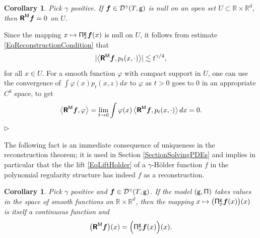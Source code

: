 \documentclass[10pt, reqno]{amsart}
\numberwithin{subsection}{section}
\numberwithin{subsubsection}{subsection}
\numberwithin{equation}{section} %
\newenvironment{Dem}[1][\unskip]{%
    \begin{list}{\hspace{1.15cm}{\sf \textbf{{\small Proof #1 --}}}}{%
        \setlength{\topsep}{0pt}%
        \setlength{\leftmargin}{0pt}%
        \setlength{\rightmargin}{0pt}%
        \setlength{\listparindent}{0pt}%
        \setlength{\itemindent}{0pt}%
        \setlength{\parsep}{0pt}%
        \addtolength{\leftmargin}{0pt}%
        \addtolength{\rightmargin}{0pt}%
    } \item }{\hfill $\rhd$\end{list}\smallskip}
\theoremstyle{mystyle}
\newtheorem{cor}[thm]{\hspace{-0.15cm}  {Corollary} }%
\theoremstyle{mystyle2}
\theoremstyle{mystyle3}
\newcommand{\bsf}{\boldsymbol{f}}
\newcommand\bbR{\mathbb{R}}
\newcommand{\mcD}{\mathcal{D}}
\begin{document}
\medskip

\begin{cor} \label{CorLocalDependenceReconstruction}
Pick $\gamma$ positive. If $\bsf\in\mcD^\gamma(T,{\sf g})$ is null on an open set $U\subset\bbR\times\bbR^d$, then $\textbf{\textsf{R}}^{\sf M}\bsf=0$ on $U$.
\end{cor}

\medskip

\begin{Dem}
Since the mapping $x\mapsto{\sf \Pi}^{\sf g}_x\bsf(x)$ is null on $U$, it follows from estimate \eqref{EqReconstructionCondition} that 
$$
\vert \big\langle \textbf{\textsf{R}}^{\sf M}\bsf, p_t(x,\cdot) \big\rangle \vert \lesssim t^{\gamma/4},
$$ 
for all $x\in U$. For a smooth function $\varphi$ with compact support in $U$, one can use the convergence of $\int\varphi(x)p_t(x,z)dx$ to $\varphi$ as $t>0$ goes to $0$ in an appropriate $C^k$ space, to get
$$
\big\langle \textbf{\textsf{R}}^{\sf M}\bsf, \varphi \big\rangle = \lim_{t\to0} \int \varphi(x)\,\big\langle \textbf{\textsf{R}}^{\sf M}\bsf, p_t(x,\cdot) \big\rangle \,dx = 0.
$$
\end{Dem}

\medskip

The following fact is an immediate consequence of uniqueness in the reconstruction theorem; it is used in Section \ref{SectionSolvingPDEs} and implies in particular that the the lift \eqref{EqLiftHolder} of a $\gamma$-H\"older function $f$ in the polynomial regularity structure has indeed $f$ as a reconstruction.

\medskip

\begin{cor}\label{Cor reconstruction of smooth model}
Pick $\gamma$ positive and $\bsf\in\mcD^\gamma(T,{\sf g})$.
If the model $({\sf g}, {\sf \Pi})$ takes values in the space of smooth functions on $\bbR\times\bbR^d$, then the mapping $x\mapsto\big({\sf \Pi}_x^{\sf g}\bsf(x)\big)(x)$ is itself a continuous function and
\begin{equation} \label{EqReconstructionFunctionLike}
\big(\textsf{\textbf{R}}^{\sf M}\bsf\big)(x) = \Big({\sf \Pi}_x^{\sf g}\bsf(x)\Big)(x).
\end{equation}
\end{cor}

\medskip
\end{document}
